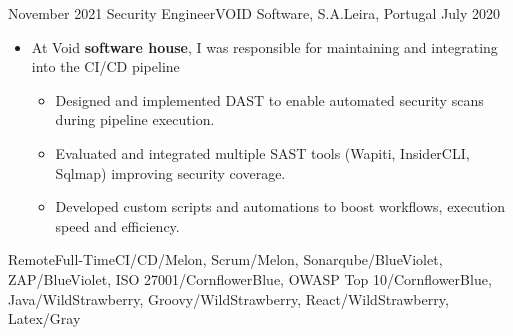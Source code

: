 \begin{experiences}
  \emptySeparator

  \experience
  {November 2021} {Security Engineer}{VOID Software, S.A.}{Leira, Portugal}
  {July 2020}{
  \begin{itemize}
    \item At Void \textbf{software house}, I was responsible for maintaining and integrating into the CI/CD pipeline
    \begin{itemize}
        \item Designed and implemented DAST to enable automated security scans during pipeline execution.
        \item Evaluated and integrated multiple SAST tools (Wapiti, InsiderCLI, Sqlmap) improving security coverage.
        \item Developed custom scripts and automations to boost workflows, execution speed and efficiency.
     \end{itemize}
  \end{itemize}}
  {Remote}{Full-Time}{{CI/CD}/Melon, Scrum/Melon, Sonarqube/BlueViolet, ZAP/BlueViolet, ISO 27001/CornflowerBlue, OWASP Top 10/CornflowerBlue, Java/WildStrawberry, Groovy/WildStrawberry, React/WildStrawberry, Latex/Gray}

  \emptySeparator

\end{experiences}